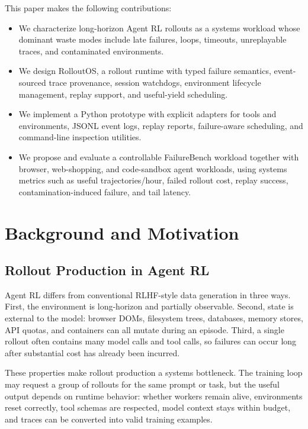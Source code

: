 \documentclass{article}
\newcommand{\sys}{RolloutOS}
\begin{document}
This paper makes the following contributions:
\begin{itemize}[leftmargin=*]
    \item We characterize long-horizon Agent RL rollouts as a systems workload whose dominant waste modes include late failures, loops, timeouts, unreplayable traces, and contaminated environments.
    \item We design \sys, a rollout runtime with typed failure semantics, event-sourced trace provenance, session watchdogs, environment lifecycle management, replay support, and useful-yield scheduling.
    \item We implement a Python prototype with explicit adapters for tools and environments, JSONL event logs, replay reports, failure-aware scheduling, and command-line inspection utilities.
    \item We propose and evaluate a controllable FailureBench workload together with browser, web-shopping, and code-sandbox agent workloads, using systems metrics such as useful trajectories/hour, failed rollout cost, replay success, contamination-induced failure, and tail latency.
\end{itemize}

\section{Background and Motivation}

\subsection{Rollout Production in Agent RL}

Agent RL differs from conventional RLHF-style data generation in three ways.
First, the environment is long-horizon and partially observable.
Second, state is external to the model: browser DOMs, filesystem trees, databases, memory stores, API quotas, and containers can all mutate during an episode.
Third, a single rollout often contains many model calls and tool calls, so failures can occur long after substantial cost has already been incurred.

These properties make rollout production a systems bottleneck.
The training loop may request a group of rollouts for the same prompt or task, but the useful output depends on runtime behavior: whether workers remain alive, environments reset correctly, tool schemas are respected, model context stays within budget, and traces can be converted into valid training examples.
\end{document}
